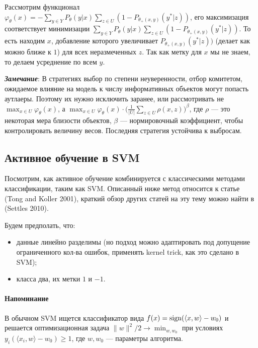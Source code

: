 \documentclass[]{article}
\let\oldparagraph\paragraph
\renewcommand{\paragraph}[1]{\oldparagraph{#1}\mbox{}}
\begin{document}
Рассмотрим функционал
\(\varphi_{\theta}(x) = - \sum_{y \in Y} P_{\theta}(y|x) \sum_{z \in U} (1 - P_{\theta_+(x, y)}(y^*|z))\),
его максимизация соответствует минимизации
\(\sum_{y \in Y} P_{\theta}(y|x) \sum_{z \in U} (1 - P_{\theta_+(x, y)}(y^*|z))\).
То есть находим \(x\), добавление которого увеличивает
\(P_{\theta_+(x, y)}(y^*|z))\) (делает как можно ближе к \(1\)) для всех
неразмеченных \(z\). Так как метку для \(x\) мы не знаем, то делаем
усреднение по всем \(y\).

\emph{\textbf{Замечание}}: В стратегиях выбор по степени неуверенности,
отбор комитетом, ожидаемое влияние на модель к числу информативных
объектов могут попасть аутлаеры. Поэтому их нужно исключить заранее, или
рассмотривать не \(\max_{x \in U} \varphi_{\theta}(x)\), а
\(\max_{x \in U} \varphi_{\theta}(x)\cdot \big(\frac{1}{|U|}\sum_{z \in U}\rho(x, z)\big)^{\beta}\),
где \(\rho\) --- это некоторая мера близости объектов, \(\beta\) ---
нормировочный коэффициент, чтобы контролировать величину весов.
Последняя стратегия устойчива к выбросам.

\subsection{Активное обучение в
SVM}\label{ux430ux43aux442ux438ux432ux43dux43eux435-ux43eux431ux443ux447ux435ux43dux438ux435-ux432-svm}

Посмотрим, как активное обучение комбинируется с классическими методами
классификации, таким как SVM. Описанный ниже метод относится к статье
(Tong and Koller 2001), краткий обзор других статей на эту тему можно
найти в (Settles 2010).

Будем предполать, что:

\begin{itemize}
\item
  данные линейно разделимы (но подход можно адаптировать под допущение
  ограниченного кол-ва ошибок, применять kernel trick, как это сделано в
  SVM);
\item
  класса два, их метки \(1\) и \(-1\).
\end{itemize}

\paragraph{Напоминание}\label{ux43dux430ux43fux43eux43cux438ux43dux430ux43dux438ux435}

В обычном SVM ищется классификатор вида
\(f(x) = {\rm sign}(\langle x, w \rangle - w_0)\) и решается
оптимизационная задача \(\|w\|^2/2 \to \min_{w, w_0}\) при условиях
\(y_i(\langle x_i, w \rangle - w_0) \geq 1\), где \(w, w_0\) ---
параметры алгоритма.
\end{document}
